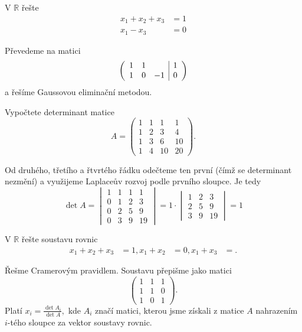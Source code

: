 \begin{priklad}
V $\mathbb R$ řešte
\begin{align*}
    x_1+x_2+x_3&=1\\
    x_1-x_3 &=0
\end{align*}
\end{priklad}

\begin{reseni}
Převedeme na matici
$$
\left (
\begin{array}{c c c | c }
1 & 1 & & 1\\
1  & 0 &-1  &0
\end{array}
\right )
$$
a řešíme Gaussovou eliminační metodou.
\end{reseni}

\begin{priklad}
Vypočtete determinant matice
$$A=\begin{pmatrix}
    1  &1 &1 &1\\
    1 &2 &3 &4 \\
    1 &3 &6 &10\\
    1 &4 &10 &20
\end{pmatrix}.$$
\end{priklad}

\begin{reseni}
Od druhého, třetího a řtvrtého řádku odečteme ten první (čímž se determinant nezmění)
a využijeme Laplaceův rozvoj podle prvního sloupce. Je tedy
$$\det A = \begin{vmatrix}
    1 &1 &1 &1\\
    0 &1 &2 &3 \\
    0 &2 &5 &9 \\
    0 &3 &9 &19
\end{vmatrix}=1 \cdot \begin{vmatrix}
1 &2 &3 \\
2 &5 &9\\
3 &9 &19
\end{vmatrix}=1$$
\end{reseni}

\begin{priklad}
V $\mathbb R$ řešte  soustavu rovnic
\begin{align*}
    x_1+x_2+x_3 &=1,
    x_1+x_2 &= 0,
    x_1+x_3 &=.
\end{align*}
\end{priklad}

\begin{reseni}
Řešme Cramerovým pravidlem. Soustavu přepišme jako matici
$$
\begin{pmatrix}
    1 & 1&1\\
    1 &1 &0 \\
    1 &0 &1
\end{pmatrix}.
$$
Platí $x_i=\frac{\det A_i}{\det A},$ kde $A_i$ značí matici, kterou jsme získali
z matice $A$ nahrazením $i$-tého sloupce za vektor  soustavy rovnic.
\end{reseni}

